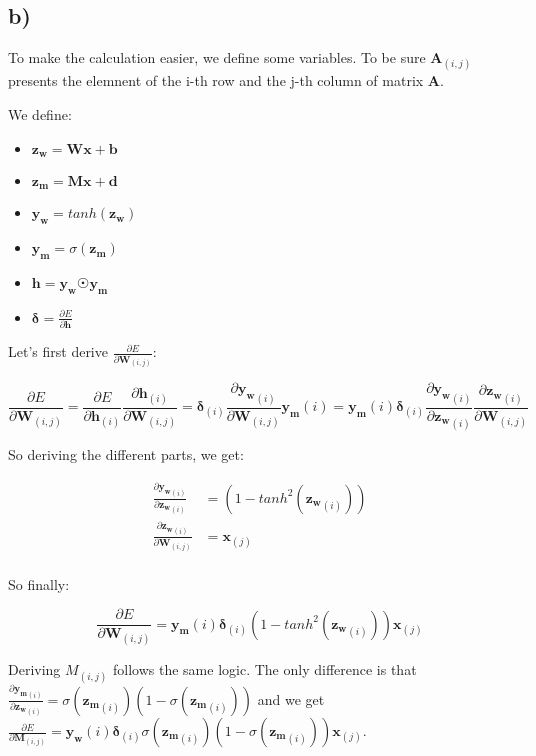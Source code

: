 \subsection*{b)} %
\label{sub:b_}

To make the calculation easier, we define some variables. 
To be sure $\textbf{A}_(i,j)$ presents the elemnent of the i-th row and 
the j-th column of matrix $\textbf{A}$.

We define: 

\newcommand{\zm}{\mathbf{z_m}}
\newcommand{\zw}{\mathbf{z_w}}
\newcommand{\yw}{\mathbf{y_w}}
\newcommand{\ym}{\mathbf{y_m}}
\newcommand{\pfr}[2]{\frac{\partial #1}{\partial #2}}

\begin{itemize}
	\item $\zw = \textbf{Wx} + \textbf{b}$
	\item $\zm = \textbf{Mx} + \textbf{d}$
	\item $\yw = tanh(\zw)$
	\item $\ym = \sigma (\zm)$
	\item $\mathbf{h} = \yw \astrosun \ym $
	\item $\mathbf{\delta} = \frac{\partial E}{\partial \mathbf{h}}$
\end{itemize}

Let's first derive $\pfr{E}{\mathbf{W}_{(i,j)}}$:

\[
\pfr{E}{\mathbf{W}_{(i,j)}} = \pfr{E}{\mathbf{h}_{(i)}}\pfr{\mathbf{h}_{(i)}}{\mathbf{W}_{(i,j)}} = \mathbf{\delta}_{(i)}\pfr{\yw_{(i)}}{\mathbf{W}_{(i,j)}}\ym{(i)} = \ym{(i)}\mathbf{\delta}_{(i)}\pfr{\yw_{(i)}}{\zw_{(i)}}\pfr{\zw_{(i)}}{\mathbf{W}_{(i,j)}}
\]

So deriving the different parts, we get: 

\begin{align*}
    \pfr{\yw_{(i)}}{\zw_{(i)}} &= (1 - tanh^2(\zw_{(i)})) \\
    \pfr{\zw_{(i)}}{\mathbf{W}_{(i,j)}} &= \mathbf{x}_{(j)}\\
\end{align*}

So finally: 

\[
\pfr{E}{\mathbf{W}_{(i,j)}} = \ym{(i)}\mathbf{\delta}_{(i)}(1 - tanh^2(\zw_{(i)}))\mathbf{x}_{(j)}
\]

Deriving $M_{(i,j)}$ follows the same logic. The only difference is that $\pfr{\ym_{(i)}}{\zw_{(i)}} = \sigma(\zm_{(i)}) (1 - \sigma(\zm_{(i)}))$ 
and we get $\pfr{E}{\mathbf{M}_{(i,j)}} = \yw{(i)}\mathbf{\delta}_{(i)}\sigma(\zm_{(i)}) (1 - \sigma(\zm_{(i)}))\mathbf{x}_{(j)}$.

